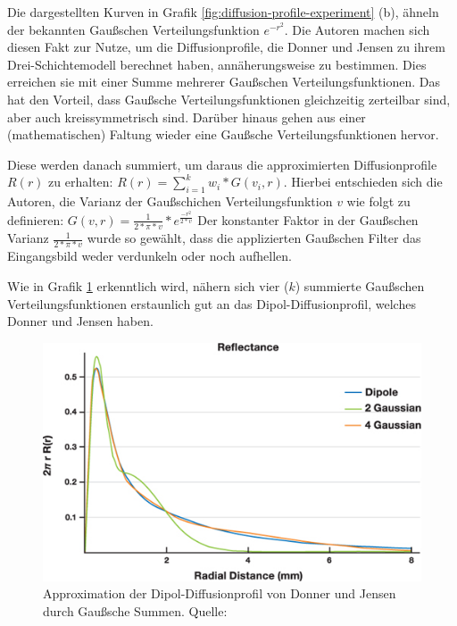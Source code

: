 \documentclass[ngerman,runningheads,a4paper]{llncs}[2018/03/10]
\begin{document}
Die dargestellten Kurven in Grafik \ref{fig:diffusion-profile-experiment} (b), ähneln der bekannten Gaußschen Verteilungsfunktion $e^{-r^{2}}$.
Die Autoren \cite{efficient-human-skin-rendering} machen sich diesen Fakt zur Nutze, um die Diffusionprofile, die Donner und Jensen \cite{spectral-bssrdf-human-skin} zu ihrem Drei-Schichtemodell berechnet haben, annäherungsweise zu bestimmen.
Dies erreichen sie mit einer Summe mehrerer Gaußschen Verteilungsfunktionen.
Das hat den Vorteil, dass Gaußsche Verteilungsfunktionen gleichzeitig zerteilbar sind, aber auch kreissymmetrisch sind.
Darüber hinaus gehen aus einer (mathematischen) Faltung wieder eine Gaußsche Verteilungsfunktionen hervor.

Diese werden danach summiert, um daraus die approximierten Diffusionprofile $R(r)$ zu erhalten: $R(r) = \sum\nolimits_{i=1}^k w_i * G(v_i, r)$.
Hierbei entschieden sich die Autoren, die Varianz der Gaußschichen Verteilungsfunktion $v$ wie folgt zu definieren:
$G(v, r) = \frac{1}{2 * \pi * v} * e^{\frac{-r^{2}}{2*v}}$
Der konstanter Faktor in der Gaußschen Varianz $\frac{1}{2 * \pi * v}$ wurde so gewählt, dass die applizierten Gaußschen Filter das Eingangsbild weder verdunkeln oder noch aufhellen.

Wie in Grafik \ref{fig:approximation} erkenntlich wird, nähern sich vier ($k$) summierte Gaußschen Verteilungsfunktionen erstaunlich gut an das Dipol-Diffusionprofil, welches Donner und Jensen \cite{spectral-bssrdf-human-skin} haben.

\begin{figure}
  \centering
  \includegraphics[scale=0.7,keepaspectratio]{./images/approximation-gaussians}
  \caption{Approximation der Dipol-Diffusionprofil von Donner und Jensen \cite{spectral-bssrdf-human-skin} durch Gaußsche Summen. Quelle: \cite{advanced-realtime-skin-rendering}}
  \label{fig:approximation}
\end{figure}
\end{document}
